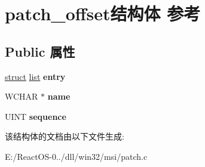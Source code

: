 \hypertarget{structpatch__offset}{}\section{patch\+\_\+offset结构体 参考}
\label{structpatch__offset}
\subsection*{Public 属性}
\begin{DoxyCompactItemize}
\item 
\mbox{\label{structpatch__offset_a34b6cf82845e4faa072ce969f7066186}} 
\hyperlink{interfacestruct}{struct} \hyperlink{classlist}{list} {\bfseries entry}
\item 
\mbox{\label{structpatch__offset_ace83062207bc5ece40c10f0db153e8cf}} 
W\+C\+H\+AR $\ast$ {\bfseries name}
\item 
\mbox{\label{structpatch__offset_a03e61f7449ae39e5dfb050fa6da3c6b2}} 
U\+I\+NT {\bfseries sequence}
\end{DoxyCompactItemize}


该结构体的文档由以下文件生成\+:\begin{DoxyCompactItemize}
\item 
E\+:/\+React\+O\+S-\/0../dll/win32/msi/patch.\+c\end{DoxyCompactItemize}
